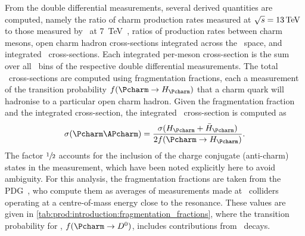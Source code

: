\begin{table}
  \centering
  \caption{%
      Branching ratios for the different decay 
      modes~\cite{PDG2014,Alexander:2008aa}.
      The \DspTophipi\ branching fraction includes the branching fraction of 
      \phiToKK\@.
  }
  \label{tab:prod:introduction:branching_ratios}
  
\end{table}

From the double differential measurements, several derived quantities are 
computed, namely the ratio of charm production rates measured at $\sqrts = 
\SI{13}{\TeV}$ to those measured by \lhcb\ at 
\SI{7}{\TeV}~\cite{LHCb-PAPER-2012-041}, ratios of production rates between 
charm mesons, open charm hadron cross-sections integrated across the \pTy\ 
space, and integrated \ccbar\ cross-sections.
Each integrated per-meson cross-section is the sum over all \pTy\ bins of the 
respective double differential measurements.
The total \ccbar\ cross-sections are computed using fragmentation fractions, 
each a measurement of the transition probability $f(\cToHc)$ that a charm quark 
will hadronise to a particular open charm hadron.
Given the fragmentation fraction and the integrated cross-section, the 
integrated \ccbar\ cross-section is computed as
\begin{equation}
  \xsec{(\ccbar)} = \frac{\xsec(\PHc + \APHc)}{2f(\cToHc)}.
  \label{eqn:prod:introduction:ccbar_cross_section}
\end{equation}
The factor $\sfrac{1}{2}$ accounts for the inclusion of the charge conjugate 
(anti-charm) states in the measurement, which have been noted explicitly here 
to avoid ambiguity.
For this analysis, the fragmentation fractions are taken from the 
\ac{PDG}~\cite{PDG2008}, who compute them as averages of measurements made at 
\epem\ colliders operating at a centre-of-mass energy close to the 
\PUpsilonFourS resonance.
These values are given in \cref{tab:prod:introduction:fragmentation_fractions}, 
where the transition probability for \PDzero, $f(\decay{\Pcharm}{\PDzero})$, 
includes contributions from \DstToDzpi\ decays.

\begin{table}
  \caption[Charm hadron fragmentation fractions]{%
    Charm hadron fragmentation fractions~\cite{PDG2008}.
  }
  \label{tab:prod:introduction:fragmentation_fractions}
  \centering
  
\end{table}

